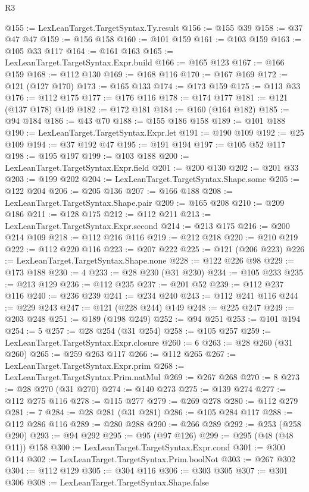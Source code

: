 \begin{lexlean}{R3}
\begin{coremodule}
{{{{{{{{{{{{{{{{{{{{{{{{{{{{{{{{{{{{{{{{{{{{{{{{{{{{{{{{{{{{{{{{{{{{{{{{{{{@155 := LexLeanTarget.TargetSyntax.Ty.result
@156 := @155 @39
@158 := @37 @47 @47
@159 := @156 @158
@160 := @101 @159
@161 := @103 @159
@163 := @105 @33 @117
@164 := @161 @163
@165 := LexLeanTarget.TargetSyntax.Expr.build
@166 := @165 @123
@167 := @166 @159
@168 := @112 @130
@169 := @168 @116
@170 := @167 @169
@172 := @121 (@127 @170)
@173 := @165 @133
@174 := @173 @159
@175 := @113 @33
@176 := @112 @175
@177 := @176 @116
@178 := @174 @177
@181 := @121 (@137 @178) @149
@182 := @172 @181
@184 := @160 (@164 @182)
@185 := @94 @184
@186 := @43 @70
@188 := @155 @186 @158
@189 := @101 @188
@190 := LexLeanTarget.TargetSyntax.Expr.let
@191 := @190 @109
@192 := @25 @109
@194 := @37 @192 @47
@195 := @191 @194
@197 := @105 @52 @117
@198 := @195 @197
@199 := @103 @188
@200 := LexLeanTarget.TargetSyntax.Expr.field
@201 := @200 @130
@202 := @201 @33
@203 := @199 @202
@204 := LexLeanTarget.TargetSyntax.Shape.some
@205 := @122 @204
@206 := @205 @136
@207 := @166 @188
@208 := LexLeanTarget.TargetSyntax.Shape.pair
@209 := @165 @208
@210 := @209 @186
@211 := @128 @175
@212 := @112 @211
@213 := LexLeanTarget.TargetSyntax.Expr.second
@214 := @213 @175
@216 := @200 @214 @109
@218 := @112 @216 @116
@219 := @212 @218
@220 := @210 @219
@222 := @112 @220 @116
@223 := @207 @222
@225 := @121 (@206 @223)
@226 := LexLeanTarget.TargetSyntax.Shape.none
@228 := @122 @226 @98
@229 := @173 @188
@230 := 4
@233 := @28 @230 (@31 @230)
@234 := @105 @233
@235 := @213 @129
@236 := @112 @235
@237 := @201 @52
@239 := @112 @237 @116
@240 := @236 @239
@241 := @234 @240
@243 := @112 @241 @116
@244 := @229 @243
@247 := @121 (@228 @244) @149
@248 := @225 @247
@249 := @203 @248
@251 := @189 (@198 @249)
@252 := @94 @251
@253 := @101 @194
@254 := 5
@257 := @28 @254 (@31 @254)
@258 := @105 @257
@259 := LexLeanTarget.TargetSyntax.Expr.closure
@260 := 6
@263 := @28 @260 (@31 @260)
@265 := @259 @263 @117
@266 := @112 @265
@267 := LexLeanTarget.TargetSyntax.Expr.prim
@268 := LexLeanTarget.TargetSyntax.Prim.natMul
@269 := @267 @268
@270 := 8
@273 := @28 @270 (@31 @270)
@274 := @140 @273
@275 := @139 @274
@277 := @112 @275 @116
@278 := @115 @277
@279 := @269 @278
@280 := @112 @279
@281 := 7
@284 := @28 @281 (@31 @281)
@286 := @105 @284 @117
@288 := @112 @286 @116
@289 := @280 @288
@290 := @266 @289
@292 := @253 (@258 @290)
@293 := @94 @292
@295 := @95 (@97 @126)
@299 := @295 (@48 (@48 @11)) @158
@300 := LexLeanTarget.TargetSyntax.Expr.cond
@301 := @300 @114
@302 := LexLeanTarget.TargetSyntax.Prim.boolNot
@303 := @267 @302
@304 := @112 @129
@305 := @304 @116
@306 := @303 @305
@307 := @301 @306
@308 := LexLeanTarget.TargetSyntax.Shape.false
}}}}}}}}}}}}}}}}}}}}}}}}}}}}}}}}}}}}}}}}}}}}}}}}}}}}}}}}}}}}}}}}}}}}}}}}}}}
\end{coremodule}
\end{lexlean}

